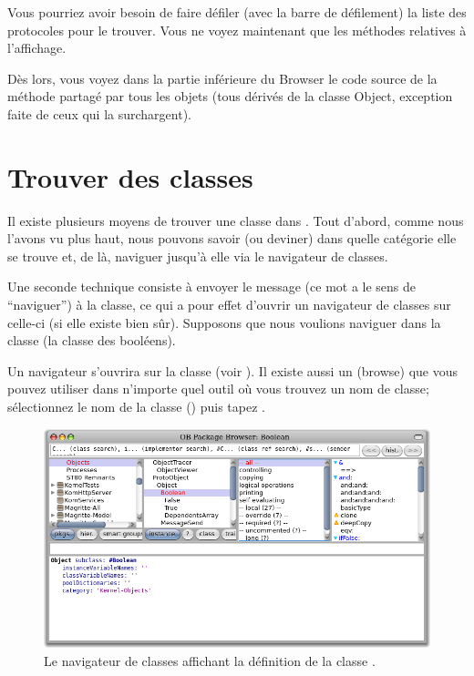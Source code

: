 \documentclass[a4paper,10pt,twoside]{book}
\begin{document}
Vous pourriez avoir besoin de faire défiler (avec la barre de
défilement) la liste des protocoles pour le trouver.
Vous ne voyez maintenant que les méthodes relatives à
l'affichage.

Dès lors, vous voyez dans la partie inférieure du Browser
le code source de la méthode  partagé par tous
les objets 
(tous dérivés de la classe Object, exception faite de ceux qui la surchargent).

\section{Trouver des classes}

Il existe plusieurs moyens de trouver une classe dans \pharo.
Tout d'abord, comme nous l'avons vu plus haut, nous pouvons savoir (ou
deviner) dans quelle catégorie elle se trouve et, de là, naviguer
jusqu'à elle via le navigateur de classes.

Une seconde technique consiste à envoyer le message 
(ce mot a le sens de ``naviguer'') à la classe, ce qui a pour effet
d'ouvrir un navigateur de classes sur celle-ci
(si elle existe bien sûr).
Supposons que nous voulions naviguer dans la classe 
(la classe des booléens).

Un navigateur s'ouvrira sur la classe  (voir ).
Il existe aussi un   (browse) que vous
pouvez utiliser dans n'importe quel outil où vous trouvez un nom de
classe;
sélectionnez le nom de la classe 
(\parex {})
puis tapez .


\begin{figure}[hbt]
	{\centerline {\includegraphics[width=\textwidth]{Kernel-objects-boolean}}}
\caption{Le navigateur de classes affichant la définition de la
  classe .}
\end{figure}
\end{document}
